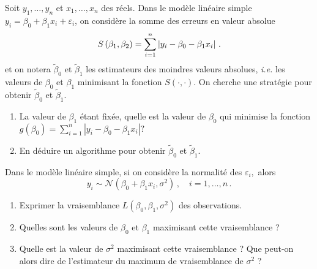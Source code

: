 \documentclass{td_um}
\providecommand{\1}{\mathds{1}}
\begin{document}
	\cor{\newpage}
	
	\exo{}
	Soit $y_{1}, \ldots, y_{n}$ et $x_{1}, \ldots, x_{n}$ des réels. Dans le modèle linéaire simple $y_{i}=\beta_{0}+\beta_{1} x_{i}+\varepsilon_{i}$, on considère la somme des erreurs en valeur absolue
	\[
	S\left(\beta_{1}, \beta_{2}\right)=\sum_{i=1}^{n}\left\lvert y_{i}-\beta_{0}-\beta_{1} x_{i}\right\rvert\,.
	\]
	et on notera $\tilde{\beta}_{0}$ et $\tilde{\beta}_{1}$ les estimateurs des moindres valeurs absolues, \textit{i.e.} les valeurs de $\beta_{0}$ et $\beta_{1}$ minimisant la fonction $S(\cdot, \cdot)$. On cherche une stratégie pour obtenir $\tilde{\beta}_{0}$ et $\tilde{\beta}_{1}$.
	\begin{enumerate}
		\item La valeur de $\beta_{1}$ étant fixée, quelle est la valeur de $\beta_{0}$ qui minimise la fonction $g\left(\beta_{0}\right)=\sum_{i=1}^{n}\left|y_{i}-\beta_{0}-\beta_{1} x_{i}\right| ?$
		\item En déduire un algorithme pour obtenir $\tilde{\beta}_{0}$ et $\tilde{\beta}_{1}$.
	\end{enumerate}
	
	
	\cor{\newpage}
	
%	
	
	
	
	Dans le modèle linéaire simple, si on considère la normalité des $\varepsilon_{i},$ alors
	\[
	y_{i} \sim \mathcal{N}\left(\beta_{0}+\beta_{1} x_{i}, \sigma^{2}\right)\,, \quad i=1, \ldots, n\,.
	\]
	\begin{enumerate}
		\item  Exprimer la vraisemblance $L\left(\beta_{0}, \beta_{1}, \sigma^{2}\right)$ des observations.
		\item  Quelles sont les valeurs de $\beta_{0}$ et $\beta_{1}$ maximisant cette vraisemblance ?
		\item  Quelle est la valeur de $\sigma^{2}$ maximisant cette vraisemblance ? Que peut-on alors dire de l'estimateur du maximum de vraisemblance de $\sigma^{2}$ ?
	\end{enumerate}
	
\end{document}
